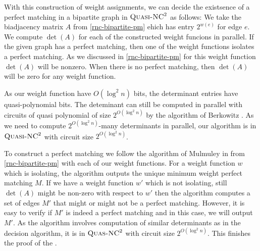 With this construction of weight assignments, we can decide the existsence of a perfect matching in a bipartite graph in $\textsc{Quasi-NC}^2$ as follows: We take the biadjacency matrix $A$ from \autoref{rnc-bipartite-pm} ehich has entry $2^{w(e)}$ for edge $e$. We compute $\det(A)$ for each of the constructed weight funcions in parallel. If the given graph has a perfect matching, then one of the weight functions isolates a perfect matching. As we discussed in \autoref{rnc-bipartite-pm} for this weight function $\det(A)$ will be nonzero. When there is no perfect matching, then $\det(A)$ will be zero for any weight function.

As our weight function have $O(\log^2n)$ bits, the determinant entries have quasi-polynomial bits. The deteminant can still be computed in parallel with circuits of quasi polynomial of size $2^{O(\log^2 n)}$ by the algorithm of Berkowitz \cite{Berkowitz_1984_Oct}. As we need to compute $2^{O(\log^2n)}$-many determinants in parallel, our algorithm is in $\textsc{Quasi-NC}^2$ with circuit size $2^{O(\log^2 n)}$.

To construct a perfect matching we follow the algorithm of Mulmuley in \cite{MulmuleyVaziraniVazirani_1987_Mia_CONF} from \autoref{rnc-bipartite-pm} with each of our weight functions. For a weight function $w$ which is isolating, the algorithm outputs the unique minimum weight perfect matching $M$. If we have a weight function $w'$ which is not isolating, still $\det (A)$ might be non-zero  with respect to $w'$ then the algorithm computes a set of edges $M'$ that might or might not be a perfect matching. However, it is easy to verify if $M'$ is indeed a perfect matching and in this case, we will output $M'$. As the algorithm involves computation of similar determinants as in the decision algorithm, it is in $\textsc{Quas-NC}^2$ with circuit size $2^{O(\log ^2 n)}$. This finishes the proof of the .